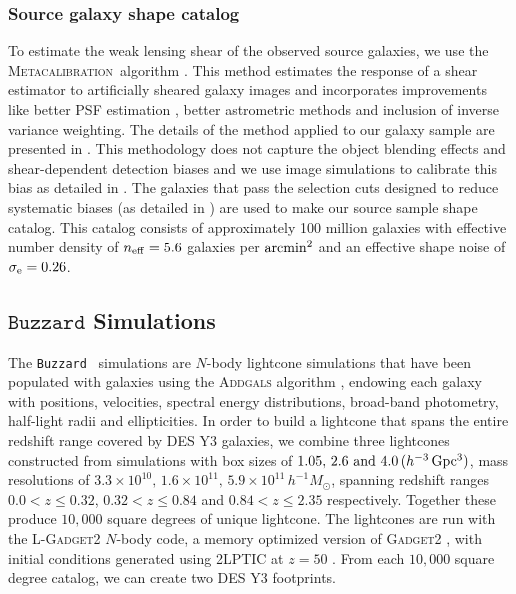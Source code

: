 \documentclass[aps, prd,twocolumn,superscriptaddress,nofootinbib,preprintnumbers]{revtex4-1}
\newcommand{\buzzard}{\texttt{Buzzard} }
\newcommand{\metacal}{{\textsc{Metacalibration}~}}
\begin{document}
\subsubsection{Source galaxy shape catalog}

To estimate the weak lensing shear of the observed source galaxies, we use the \metacal algorithm \citep{Sheldon_2017, huff2017metacalibration}. This method estimates the response of a shear estimator to artificially sheared galaxy images and incorporates improvements like better PSF estimation \citep{y3-piff}, better astrometric methods \citep{y3-gold} and inclusion of inverse variance weighting. The details of the method applied to our galaxy sample are presented in \cite{y3-shapecatalog}. This methodology does not capture the object blending effects and shear-dependent detection biases and we use image simulations to calibrate this bias as detailed in \citet*{y3-imagesims}. The galaxies that pass the selection cuts designed to reduce systematic biases (as detailed in \citealt{y3-shapecatalog}) are used to make our source sample shape catalog. This catalog consists of approximately 100 million galaxies with effective number density of $n_{\rm eff} = 5.6$ galaxies per ${\rm arcmin}^2$ and an effective shape noise of $\sigma_{\rm e} = 0.26$.



\subsection{$\buzzard$ Simulations}

The \buzzard\ simulations are $N$-body lightcone simulations that have been populated with galaxies using the \textsc{Addgals} algorithm \citep{Addgals}, endowing each galaxy with positions, velocities, spectral energy distributions, broad-band photometry, half-light radii and ellipticities. In order to build a lightcone that spans the entire redshift range covered by DES Y3 galaxies, we combine three lightcones constructed from simulations with box sizes of $1.05,\, 2.6 \textrm{ and } 4.0\, (h^{-3}\, \rm Gpc^3)$, mass resolutions of $3.3\times10^{10},\, 1.6\times10^{11},\, 5.9\times10^{11}\, h^{-1}M_{\odot}$, spanning redshift ranges $0.0< z \leq 0.32$, $0.32< z \leq 0.84$ and $0.84< z \leq 2.35$ respectively. Together these produce $10,000$ square degrees of unique lightcone. The lightcones are run with the \textsc{L-Gadget2} $N$-body code, a memory optimized version of \textsc{Gadget2} \citep{Springel_2005}, with initial conditions generated using \textsc{2LPTIC} at $z=50$ \citep{Crocce2012}. From each $10,000$ square degree catalog, we can create two DES Y3 footprints.
\end{document}
